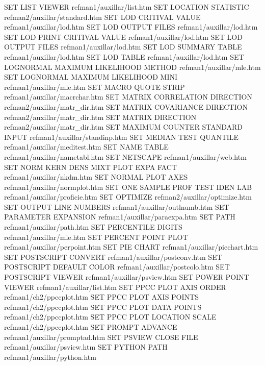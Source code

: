 SET LIST VIEWER                         refman1/auxillar/list.htm
SET LOCATION STATISTIC                  refman2/auxillar/standard.htm
SET LOD CRITIVAL VALUE                  refman1/auxillar/lod.htm
SET LOD OUTPUT FILES                    refman1/auxillar/lod.htm
SET LOD PRINT CRITIVAL VALUE            refman1/auxillar/lod.htm
SET LOD OUTPUT FILES                    refman1/auxillar/lod.htm
SET LOD SUMMARY TABLE                   refman1/auxillar/lod.htm
SET LOD TABLE                           refman1/auxillar/lod.htm
SET LOGNORMAL MAXIMUM LIKELIHOOD METHOD refman1/auxillar/mle.htm
SET LOGNORMAL MAXIMUM LIKELIHOOD MINI   refman1/auxillar/mle.htm
SET MACRO QUOTE STRIP                   refman1/auxillar/macrchar.htm
SET MATRIX CORRELATION DIRECTION        refman2/auxillar/matr_dir.htm
SET MATRIX COVARIANCE DIRECTION         refman2/auxillar/matr_dir.htm
SET MATRIX DIRECTION                    refman2/auxillar/matr_dir.htm
SET MAXIMUM COUNTER STANDARD INPUT      refman1/auxillar/standinp.htm
SET MEDIAN TEST QUANTILE                refman1/auxillar/meditest.htm
SET NAME TABLE                          refman1/auxillar/nametabl.htm
SET NETSCAPE                            refman1/auxillar/web.htm
SET NORM KERN DENS MIXT PLOT EXPA FACT  refman1/auxillar/nkdm.htm
SET NORMAL PLOT AXES                    refman1/auxillar/normplot.htm
SET ONE SAMPLE PROF TEST IDEN LAB       refman1/auxillar/proficie.htm
SET OPTIMIZE                            refman2/auxillar/optimize.htm
SET OUTPUT LINE NUMBERS                 refman1/auxillar/outlnumb.htm
SET PARAMETER EXPANSION                 refman1/auxillar/paraexpa.htm
SET PATH                                refman1/auxillar/path.htm
SET PERCENTILE DIGITS                   refman1/auxillar/mle.htm
SET PERCENT POINT PLOT                  refman1/auxillar/perpoint.htm
SET PIE CHART                           refman1/auxillar/piechart.htm
SET POSTSCRIPT CONVERT                  refman1/auxillar/postconv.htm
SET POSTSCRIPT DEFAULT COLOR            refman1/auxillar/postcolo.htm
SET POSTSCRIPT VIEWER                   refman1/auxillar/psview.htm
SET POWER POINT VIEWER                  refman1/auxillar/list.htm
SET PPCC PLOT AXIS ORDER                refman1/ch2/ppccplot.htm
SET PPCC PLOT AXIS POINTS               refman1/ch2/ppccplot.htm
SET PPCC PLOT DATA POINTS               refman1/ch2/ppccplot.htm
SET PPCC PLOT LOCATION SCALE            refman1/ch2/ppccplot.htm
SET PROMPT ADVANCE                      refman1/auxillar/promptad.htm
SET PSVIEW CLOSE FILE                   refman1/auxillar/psview.htm
SET PYTHON PATH                         refman1/auxillar/python.htm
